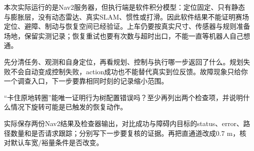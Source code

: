 \begin{note}
本次实际运行的是Nav2服务器，但执行端是软件积分模型：定位固定、只有静态与膨胀层，没有动态雷达、真实SLAM、惯性或打滑。因此软件结果不能证明赛场定位、避障、制动与恢复空间已经验证。上车仍要按真实尺寸、传感器与规则准备场地，保留实测记录；恢复重试也要有次数与超时出口，不能一直等机器人自己想通。
\end{note}

\begin{conclusion}
先分清任务、观测和自身定位，再看规划、控制与执行哪一步返回了什么。规划失败不会自动变成控制失败，action成功也不能替代真实到位反馈。故障现象只给你一个调查入口，下一步要靠相同时刻的记录缩小范围。
\end{conclusion}

\begin{exercise}
\label{v3-ex-nav-5}
“卡住原地转圈”能唯一证明行为树配置错误吗？至少再列出两个检查项，并说明什么情况下旋转可能是已触发的恢复动作。
\end{exercise}

\begin{exercise}
\label{v3-ex-nav-6}
实际保存两份Nav2结果及检查器输出，对比成功与障碍内目标的status、error、路径数量和是否请求跟踪；分别写下一步要复核的证据。再把直通道改成0.7 m，核对默认车宽/裕量条件是否改变。
\end{exercise}

